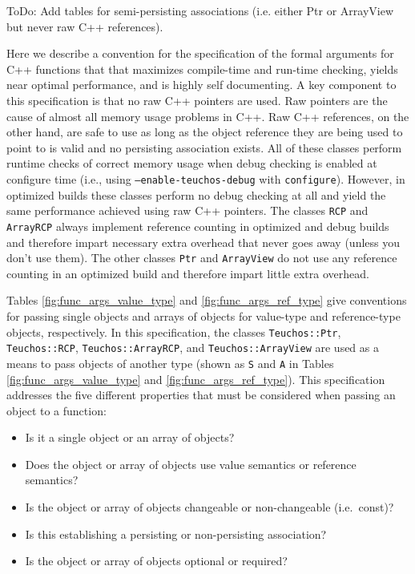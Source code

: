 \documentclass[pdf,ps2pdf,11pt]{SANDreport}
\begin{document}
ToDo: Add tables for semi-persisting associations (i.e. either Ptr or
ArrayView but never raw C++ references).


Here we describe a convention for the specification of the formal
arguments for C++ functions that that maximizes compile-time and
run-time checking, yields near optimal performance, and is highly self
documenting.  A key component to this specification is that no raw C++
pointers are used.  Raw pointers are the cause of almost all memory
usage problems in C++.  Raw C++ references, on the other hand, are
safe to use as long as the object reference they are being used to
point to is valid and no persisting association exists.  All of these
classes perform runtime checks of correct memory usage when debug
checking is enabled at configure time (i.e., using
{}\texttt{--enable-teuchos-debug} with {}\texttt{configure}).
However, in optimized builds these classes perform no debug checking
at all and yield the same performance achieved using raw C++ pointers.
The classes {}\texttt{RCP} and {}\texttt{ArrayRCP} always implement
reference counting in optimized and debug builds and therefore impart
necessary extra overhead that never goes away (unless you don't use
them).  The other classes {}\texttt{Ptr} and {}\texttt{ArrayView} do
not use any reference counting in an optimized build and therefore
impart little extra overhead.

Tables {}\ref{fig:func_args_value_type} and
{}\ref{fig:func_args_ref_type} give conventions for passing single
objects and arrays of objects for value-type {} and reference-type {} objects,
respectively.  In this specification, the classes
{}\texttt{Teuchos\-::Ptr}, {}\texttt{Teuchos\-::RCP},
{}\texttt{Teuchos\-::ArrayRCP}, and {}\texttt{Teuchos\-::ArrayView}
are used as a means to pass objects of another type (shown as
{}\texttt{S} and {}\texttt{A} in Tables
{}\ref{fig:func_args_value_type} and {}\ref{fig:func_args_ref_type}).
This specification addresses the five different properties that must
be considered when passing an object to a function:

\begin{itemize}

{}\item Is it a single object or an array of objects?

{}\item Does the object or array of objects use value semantics or
reference semantics?

{}\item Is the object or array of objects changeable or non-changeable
(i.e.\ const)?

{}\item Is this establishing a persisting or non-persisting association?

{}\item Is the object or array of objects optional or required?

\end{itemize}
\end{document}
